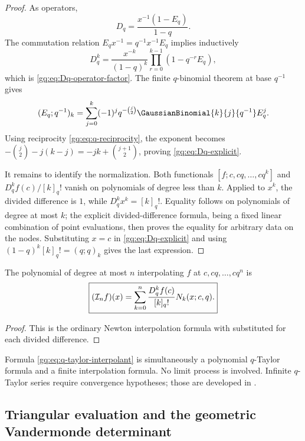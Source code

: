 \begin{proof}
As operators,
\[
 D_q=\frac{x^{-1}(1-E_q)}{1-q}.
\]
The commutation relation $E_qx^{-1}=q^{-1}x^{-1}E_q$ implies inductively
\[
 D_q^k=\frac{x^{-k}}{(1-q)^k}
       \prod_{r=0}^{k-1}(1-q^{-r}E_q),
\]
which is \eqref{gq:eq:Dq-operator-factor}.  The finite $q$-binomial theorem at
base $q^{-1}$ gives
\[
 (E_q;q^{-1})_k
 =\sum_{j=0}^k(-1)^jq^{-\binom j2}
   \GaussianBinomial{k}{j}{q^{-1}}E_q^j.
\]
Using reciprocity \eqref{gq:eq:q-reciprocity}, the exponent becomes
$-\binom j2-j(k-j)=-jk+\binom{j+1}{2}$, proving
\eqref{gq:eq:Dq-explicit}.

It remains to identify the normalization.  Both functionals
$[f;c,cq,\ldots,cq^k]$ and $D_q^kf(c)/[k]_q!$ vanish on polynomials of degree
less than $k$.  Applied to $x^k$, the divided difference is $1$, while
$D_q^kx^k=[k]_q!$.  Equality follows on polynomials of degree at most $k$;
the explicit divided-difference formula, being a fixed linear combination of
point evaluations, then proves the equality for arbitrary data on the nodes.
Substituting $x=c$ in \eqref{gq:eq:Dq-explicit} and using
$(1-q)^k[k]_q!=(q;q)_k$ gives the last expression.
\end{proof}

\begin{corollary}
\label{gq:cor:q-taylor-interpolant}
The polynomial of degree at most $n$ interpolating $f$ at
$c,cq,\ldots,cq^n$ is
\begin{equation}
 \boxed{
 (\mathcal I_nf)(x)=\sum_{k=0}^n
 \frac{D_q^kf(c)}{[k]_q!}N_k(x;c,q).}
 \label{gq:eq:q-taylor-interpolant}
\end{equation}
\end{corollary}

\begin{proof}
This is the ordinary Newton interpolation formula with
 substituted for each divided difference.
\end{proof}

\begin{remark}
Formula \eqref{gq:eq:q-taylor-interpolant} is simultaneously a polynomial
$q$-Taylor formula and a finite interpolation formula.  No limit process is
involved.  Infinite $q$-Taylor series require convergence hypotheses; those
are developed in .
\end{remark}

\subsection{Triangular evaluation and the geometric Vandermonde determinant}

